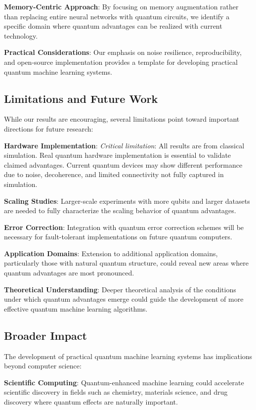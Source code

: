 \textbf{Memory-Centric Approach}: By focusing on memory augmentation rather than replacing entire neural networks with quantum circuits, we identify a specific domain where quantum advantages can be realized with current technology.

\textbf{Practical Considerations}: Our emphasis on noise resilience, reproducibility, and open-source implementation provides a template for developing practical quantum machine learning systems.

\subsection{Limitations and Future Work}

While our results are encouraging, several limitations point toward important directions for future research:

\textbf{Hardware Implementation}: \textit{Critical limitation}: All results are from classical simulation. Real quantum hardware implementation is essential to validate claimed advantages. Current quantum devices may show different performance due to noise, decoherence, and limited connectivity not fully captured in simulation.

\textbf{Scaling Studies}: Larger-scale experiments with more qubits and larger datasets are needed to fully characterize the scaling behavior of quantum advantages.

\textbf{Error Correction}: Integration with quantum error correction schemes will be necessary for fault-tolerant implementations on future quantum computers.

\textbf{Application Domains}: Extension to additional application domains, particularly those with natural quantum structure, could reveal new areas where quantum advantages are most pronounced.

\textbf{Theoretical Understanding}: Deeper theoretical analysis of the conditions under which quantum advantages emerge could guide the development of more effective quantum machine learning algorithms.

\subsection{Broader Impact}

The development of practical quantum machine learning systems has implications beyond computer science:

\textbf{Scientific Computing}: Quantum-enhanced machine learning could accelerate scientific discovery in fields such as chemistry, materials science, and drug discovery where quantum effects are naturally important.

